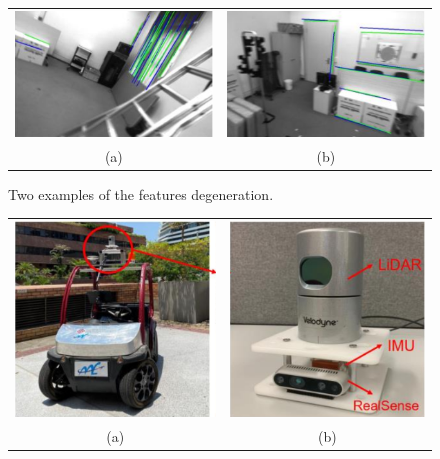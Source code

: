 \documentclass[10pt, letterpaper]{article}
\begin{document}
\begin{multicols*}{2}
\begin{figure}[H]
    \centering
    \begin{tabular}{cc}{}
        \includegraphics[width=0.48\columnwidth]{images/a1.png}&
        \includegraphics[width=0.48\columnwidth]{images/b1.png}\\
         (a)  & (b) \\
         
    \end{tabular}
    \caption{Two examples of the features degeneration.}
    \label{fig:table_ab1}
\end{figure}

\begin{figure}[H]
    \centering
    \begin{tabular}{cc}{}
        \includegraphics[width=0.48\columnwidth]{images/a2.png}&
        \includegraphics[width=0.48\columnwidth]{images/b2.png}\\
         (a)  & (b) \\
         

\end{tabular}
\end{figure}
\end{multicols*}
\end{document}
